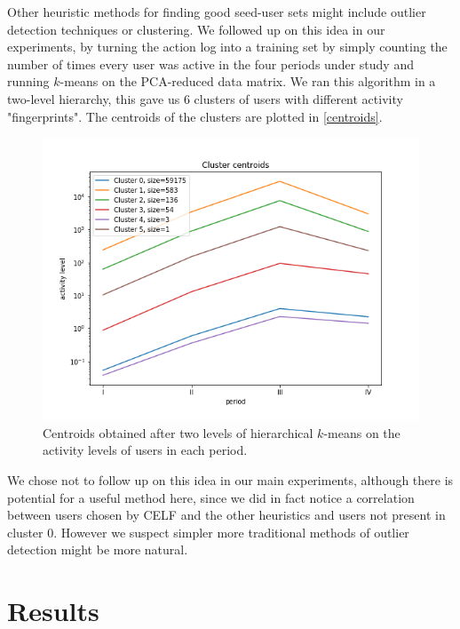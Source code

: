 \documentclass[sigconf]{acmart}
\begin{document}
Other heuristic methods for finding good seed-user sets might include outlier detection techniques or clustering. We followed up on this idea in our experiments, by turning the action log into a training set by simply counting the number of times every user was active in the four periods under study and running $k$-means on the PCA-reduced data matrix. We ran this algorithm in a two-level hierarchy, this gave us 6 clusters of users with different activity "fingerprints". The centroids of the clusters are plotted in \autoref{centroids}.

\begin{figure}[htbp]
\begin{center}
\includegraphics[width=0.9\linewidth]{./Figures/centroids.png}
\caption{Centroids obtained after two levels of hierarchical $k$-means on the activity levels of users in each period.}
\label{centroids}
\end{center}
\end{figure}

We chose not to follow up on this idea in our main experiments, although there is potential for a useful method here, since we did in fact notice a correlation between users chosen by CELF and the other heuristics and users not present in cluster 0. However we suspect simpler more traditional methods of outlier detection might be more natural.  

\section{Results}
\end{document}

